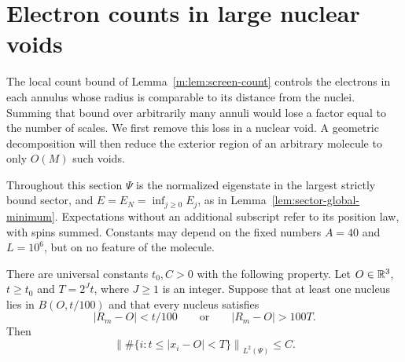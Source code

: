\section{Electron counts in large nuclear voids}\label{m:sec:void}

The local count bound of Lemma~\ref{m:lem:screen-count} controls the
electrons in each annulus whose radius is comparable to its distance
from the nuclei.  Summing that bound over arbitrarily many annuli would
lose a factor equal to the number of scales.  We first remove this loss
in a nuclear void.  A geometric decomposition will then reduce the
exterior region of an arbitrary molecule to only $O(M)$ such voids.

Throughout this section $\Psi$ is the normalized eigenstate in the
largest strictly bound sector, and $E=E_N=\inf_{j\ge0}E_j$, as in
Lemma~\ref{lem:sector-global-minimum}.  Expectations without an additional
subscript refer to its position law, with spins summed.  Constants may
depend on the fixed numbers $A=40$ and $L=10^6$, but on no feature of the
molecule.

\begin{lemma}\label{m:lem:void-shell}
There are universal constants $t_0,C>0$ with the following property.
Let $O\in\mathbb R^3$, $t\ge t_0$ and $T=2^Jt$, where $J\ge1$ is an integer.
Suppose that at least one nucleus lies in $B(O,t/100)$ and that every
nucleus satisfies
\[
 |R_m-O|<t/100\qquad\text{or}\qquad |R_m-O|>100T.
\]
Then
\begin{equation}\label{m:eq:void-annulus-count}
 \left\|\#\{i:t\le |x_i-O|<T\}\right\|_{L^2(\Psi)}\le C.
\end{equation}
\end{lemma}

